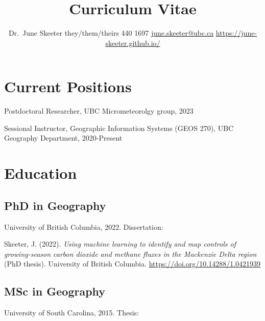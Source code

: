 \documentclass[
]{article}
\title{ \vspace{-1.5em}
\bf Curriculum Vitae \vspace{-.5em}
}
\author{
      {Dr.~June Skeeter 
    \authorcr %
    they/them/theirs
    \authorcr
    604 440 1697
    \authorcr
    \href{mailto:june.skeeter@ubc.ca}{june.skeeter@ubc.ca}}
    \authorcr
    \href{https://june-skeeter.github.io/}{https://june-skeeter.github.io/}
    

      }
\date{}
\newlength{\cslhangindent}
\newlength{\cslentryspacingunit} %
\newenvironment{CSLReferences}[2] %
 {%
  \setlength{\parindent}{0pt}
  \ifodd #1
  \let\oldpar\par
  \def\par{\hangindent=\cslhangindent\oldpar}
  \fi
  \setlength{\parskip}{#2\cslentryspacingunit}
 }%
 {}
\begin{document}
\maketitle
\ifdefined\Shaded\renewenvironment{Shaded}{\begin{tcolorbox}[enhanced, interior hidden, borderline west={3pt}{0pt}{shadecolor}, sharp corners, frame hidden, boxrule=0pt, breakable]}{\end{tcolorbox}}\fi

\hypertarget{current-positions}{%
\section{Current Positions}\label{current-positions}}

Postdoctoral Researcher, UBC Micrometeorolgy group, 2023

Sessional Instructor, Geographic Information Systems (GEOS 270), UBC
Geography Department, 2020-Present

\hypertarget{education}{%
\section{Education}\label{education}}

\hypertarget{phd-in-geography}{%
\subsection{PhD in Geography}\label{phd-in-geography}}

University of British Columbia, 2022. Dissertation:

\hypertarget{refs-2.1}{}
\begin{CSLReferences}{1}{0}
\leavevmode{}%
Skeeter, J. (2022). \emph{Using machine learning to identify and map
controls of growing-season carbon dioxide and methane fluxes in the
{Mackenzie} {Delta} region} (PhD thesis). University of British
Columbia. \url{https://doi.org/10.14288/1.0421939}

\end{CSLReferences}

\hypertarget{msc-in-geography}{%
\subsection{MSc in Geography}\label{msc-in-geography}}

University of South Carolina, 2015. Thesis:
\end{document}
